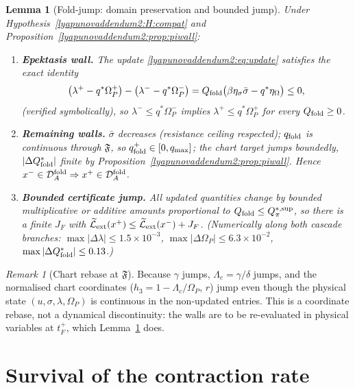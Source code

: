 \documentclass[11pt,a4paper,oneside]{book}
\newcommand{\Op}{\Omega_P}
\newcommand{\Lc}{\Lambda_c}
\newcommand{\Qf}{Q_{\rm fold}}
\newcommand{\DAf}{\mathcal D_A^{\rm fold}}
\newcommand{\qf}{q_{\rm fold}}
\newcommand{\Lt}{\widetilde{\mathcal L}_{\rm ext}}
\newcommand{\fold}{\mathfrak{F}}
\theoremstyle{plain}
\newtheorem{lemma}{Lemma}[chapter]
\theoremstyle{definition}
\theoremstyle{remark}
\newtheorem*{remark}{Remark}
\begin{document}
\begin{lemma}[Fold-jump: domain preservation and bounded jump]\label{lyapunovaddendum2:lem:foldjump}
Under Hypothesis~\ref{lyapunovaddendum2:H:compat} and Proposition~\ref{lyapunovaddendum2:prop:piwall}:
\begin{enumerate}[label=(\arabic*),leftmargin=2em,itemsep=2pt]
\item \textbf{Epektasis wall.} The update \eqref{lyapunovaddendum2:eq:update} satisfies the exact identity
\begin{equation}
\bigl(\lambda^+-q^\ast\Op^+\bigr)-\bigl(\lambda^--q^\ast\Op^-\bigr)
=\Qf\bigl(\beta\eta_\sigma\bar\sigma-q^\ast\eta_\Omega\bigr)\le0,
\end{equation}
(verified symbolically), so $\lambda^-\le q^\ast\Op^-$ implies $\lambda^+\le q^\ast\Op^+$ for every
$\Qf\ge0$.
\item \textbf{Remaining walls.} $\bar\sigma$ decreases (resistance ceiling respected); $\qf$ is
continuous through $\fold$, so $\qf^+\in[0,q_{\max}]$; the chart target jumps boundedly, $|\Delta\Qf^*|$
finite by Proposition~\ref{lyapunovaddendum2:prop:piwall}. Hence $x^-\in\DAf\Rightarrow x^+\in\DAf$.
\item \textbf{Bounded certificate jump.} All updated quantities change by bounded multiplicative or
additive amounts proportional to $\Qf\le Q^{*,\sup}_\pi$, so there is a finite $J_F$ with
$\Lt(x^+)\le\Lt(x^-)+J_F$. (Numerically along both cascade branches:
$\max|\Delta\lambda|\le1.5\times10^{-3}$, $\max|\Delta\Op|\le6.3\times10^{-2}$,
$\max|\Delta\Qf^*|\le0.13$.)
\end{enumerate}
\end{lemma}

\begin{remark}[Chart rebase at $\fold$]
Because $\gamma$ jumps, $\Lc=\gamma/\delta$ jumps, and the normalised chart coordinates
($h_3=1-\Lc/\Op$, $r$) jump even though the physical state $(u,\sigma,\lambda,\Op)$ is continuous in the
non-updated entries. This is a coordinate rebase, not a dynamical discontinuity: the walls are to be
re-evaluated in physical variables at $t_F^+$, which Lemma~\ref{lyapunovaddendum2:lem:foldjump} does.
\end{remark}

\section{Survival of the contraction rate}
\end{document}
